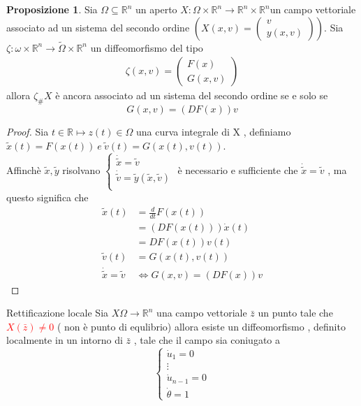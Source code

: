 \documentclass{article}
\theoremstyle{definition}
\newtheorem*{proposizione}{Proposizione}
\newcommand{\R}{\mathbb{R}}
\newcommand{\Rn}{\R^n}
\newcommand{\tom}{\widetilde{\Omega}}
\begin{document}
\begin{proposizione}
	Sia $\Omega \subseteq \Rn$ un aperto $X : \Omega \times \Rn \rightarrow \Rn\times \Rn$un campo vettoriale associato ad un sistema del secondo ordine $\left( X(x,v)=\begin{pmatrix} 
v \\
y(x,v)
\end{pmatrix}\right)$. Sia $\zeta : \omega \times \Rn \rightarrow \tom \times \Rn$ un diffeomorfismo del tipo
\begin{align*}
	\zeta(x,v)=\begin{pmatrix}
		F(x) \\
		G(x,v)
	\end{pmatrix}
\end{align*}
allora $\zeta_{\#}X$ è ancora associato ad un sistema del secondo ordine  se e solo se 
$$G(x,v)=(DF(x))v$$
\end{proposizione}  
\begin{proof}
	Sia $t \in \R \mapsto z(t) \in \Omega$ una curva integrale di X , definiamo \\$\widetilde{x}(t)=F(x(t)) \ e \ \widetilde{v}(t)=G(x(t),v(t))$. \\Affinchè $\widetilde{x} , \widetilde{y}$ risolvano $\begin{cases}
		\dot{\widetilde{x}} =\widetilde{v} \\
			\dot{\widetilde{v}} =\widetilde{y}(\widetilde{x},\widetilde{v}) \\
	\end{cases}$ è necessario e sufficiente che $	\dot{\widetilde{x}} =\widetilde{v} $ , ma questo significa che 
	\begin{align*}
		\widetilde{x}(t)&=\frac{d}{dt}F(x(t)) \\ &= (DF(x(t)))\dot{x}(t) \\&= DF(x(t)) v(t) \\ \widetilde{v}(t)&=G(x(t),v(t)) \\ \dot{\widetilde{x}} =\widetilde{v}  &\iff G(x,v)=(DF(x))v
 	\end{align*}
\end{proof}
\begin{teo}{Rettificazione locale}{}
	Sia $X \Omega \rightarrow \Rn $ una campo vettoriale $\bar{z}$ un punto tale che \textcolor{red}{$X(\bar{z} ) \neq 0  $  } ( non è punto di equlibrio) allora esiste un diffeomorfismo , definito localmente in un intorno di $\bar{z}$ , tale che  il campo sia coniugato a $$ \begin{cases}
	\dot{u}_1=0 \\ 
	\vdots \\
		\dot{u}_{n-1}=0 \\
		\dot{\theta } = 1 
	\end{cases} $$
 \end{teo} 
 
\end{document}
